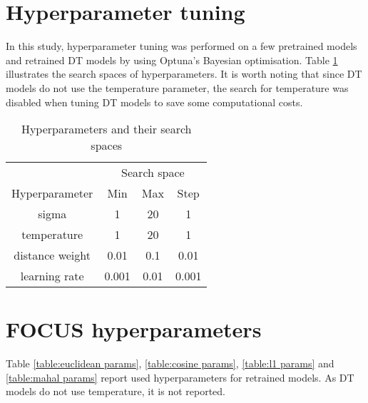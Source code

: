 \section{Hyperparameter tuning}
\label{appendix:hparams tuning}
In this study, hyperparameter tuning was performed on a few pretrained models and retrained DT models by using Optuna's Bayesian optimisation. Table \ref{table:hparamsSearch} illustrates the search spaces of hyperparameters. It is worth noting that since DT models do not use the temperature parameter, the search for temperature was disabled when tuning DT models to save some computational costs.

\begin{table}[htb]
\centering
\begin{tabular}{cccc}
                                      & \multicolumn{3}{c}{Search space}                              \\
\multicolumn{1}{c}{Hyperparameter}  & \multicolumn{1}{c}{Min}   & \multicolumn{1}{c}{Max}  & Step  \\ \hline
\multicolumn{1}{c}{sigma}           & \multicolumn{1}{c}{1}     & \multicolumn{1}{c}{20}   & 1     \\
\multicolumn{1}{c}{temperature}     & \multicolumn{1}{c}{1}     & \multicolumn{1}{c}{20}   & 1     \\
\multicolumn{1}{c}{distance weight} & \multicolumn{1}{c}{0.01}  & \multicolumn{1}{c}{0.1}  & 0.01  \\
\multicolumn{1}{c}{learning rate}   & \multicolumn{1}{c}{0.001} & \multicolumn{1}{c}{0.01} & 0.001 \\ \hline
\end{tabular}
\caption[hparamsSearch]{Hyperparameters and their search spaces}
\label{table:hparamsSearch}
\end{table}

\section{FOCUS hyperparameters}
\label{appendix:focus hyperparameters}
Table \ref{table:euclidean params}, \ref{table:cosine params}, \ref{table:l1 params} and \ref{table:mahal params} report used hyperparameters for retrained models. As DT models do not use temperature, it is not reported.

